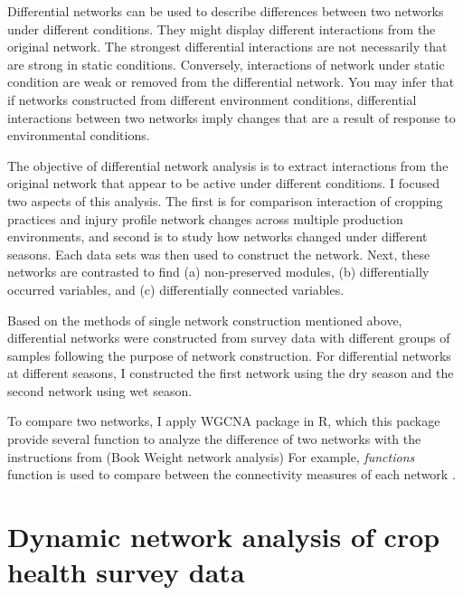 Differential networks can be used to describe differences between two networks under different conditions. They might display different interactions from the original network. The strongest differential interactions are not necessarily that are strong in static conditions. Conversely, interactions of network under static condition are weak or removed from the differential network. You may infer that if networks constructed from different environment conditions, differential interactions between two networks imply changes that are a result of response to environmental conditions. 

The objective of differential network analysis is to extract interactions from the original network that appear to be active under different conditions. I focused two aspects of this analysis. The first is for comparison interaction of cropping practices and injury profile network changes across multiple production environments, and second is to study how networks changed under different seasons. Each data sets was then used to construct the network. Next, these networks are contrasted to find (a) non-preserved modules, (b) differentially occurred variables, and (c) differentially connected variables.

Based on the methods of single network construction mentioned above, differential networks were constructed from survey data with different groups of samples following the purpose of network construction. For differential networks at different seasons, I constructed the first network using the dry season and the second network using wet season. 

To compare two networks, I apply WGCNA package in R, which this package provide several function to analyze the   difference of two networks with the instructions from (Book Weight network analysis) For example, \textit{functions} function is used to compare between the connectivity measures of each network  . 



 

\section*{Dynamic network analysis of crop health survey data}

